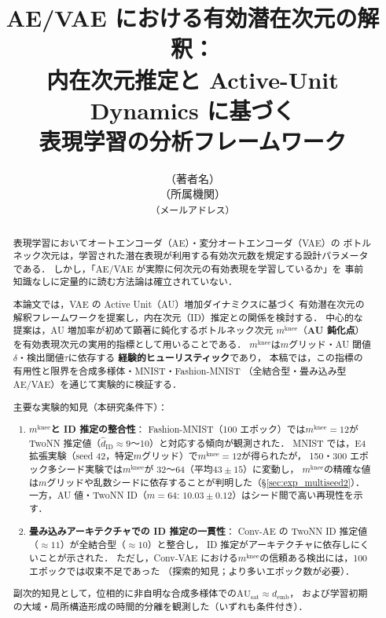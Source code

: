 \documentclass[11pt,a4paper]{jsarticle}
\title{AE/VAE における有効潜在次元の解釈：\\
       内在次元推定と Active-Unit Dynamics に基づく\\
       表現学習の分析フレームワーク}
\author{（著者名）\\
{\small （所属機関）}\\
{\small \texttt{（メールアドレス）}}}
\date{}
\newcommand{\mknee}{m^{\mathrm{knee}}}
\begin{document}
\maketitle

\begin{abstract}
表現学習においてオートエンコーダ（AE）・変分オートエンコーダ（VAE）の
ボトルネック次元は，学習された潜在表現が利用する有効次元数を規定する設計パラメータである．
しかし，「AE/VAE が実際に何次元の有効表現を学習しているか」を
事前知識なしに定量的に読む方法論は確立されていない．

本論文では，VAE の Active Unit（AU）増加ダイナミクスに基づく
有効潜在次元の解釈フレームワークを提案し，内在次元（ID）推定との関係を検討する．
中心的な提案は，AU 増加率が初めて顕著に鈍化するボトルネック次元
$m^{\mathrm{knee}}$（\textbf{AU 鈍化点}）を有効表現次元の実用的指標として用いることである．
$m^{\mathrm{knee}}$は$m$グリッド・AU 閾値$\delta$・検出閾値$\tau$に依存する
\textbf{経験的ヒューリスティック}であり，
本稿では，この指標の有用性と限界を合成多様体・MNIST・Fashion-MNIST
（全結合型・畳み込み型 AE/VAE）を通じて実験的に検証する．

主要な実験的知見（本研究条件下）：
\begin{enumerate}
  \item \textbf{$m^{\mathrm{knee}}$と ID 推定の整合性}：
        Fashion-MNIST（100 エポック）では$m^{\mathrm{knee}} = 12$が
        TwoNN 推定値（$\hat{d}_\mathrm{ID} \approx 9$〜10）と対応する傾向が観測された．
        MNIST では，E4 拡張実験（seed 42，特定$m$グリッド）で$\mknee = 12$が得られたが，
        150・300 エポック多シード実験では$\mknee$が 32〜64（平均$43 \pm 15$）に変動し，
        $\mknee$の精確な値は$m$グリッドや乱数シードに依存することが判明した（§\ref{sec:exp_multiseed2}）．
        一方，AU 値・TwoNN ID（$m=64$: $10.03 \pm 0.12$）はシード間で高い再現性を示す．
  \item \textbf{畳み込みアーキテクチャでの ID 推定の一貫性}：
        Conv-AE の TwoNN ID 推定値（$\approx 11$）が全結合型（$\approx 10$）と整合し，
        ID 推定がアーキテクチャに依存しにくいことが示された．
        ただし，Conv-VAE における$\mknee$の信頼ある検出には，100 エポックでは収束不足であった
        （探索的知見；より多いエポック数が必要）．
\end{enumerate}
副次的知見として，位相的に非自明な合成多様体での$\mathrm{AU}_{\mathrm{sat}} \approx d_{\mathrm{emb}}$，
および学習初期の大域・局所構造形成の時間的分離を観測した（いずれも条件付き）．
\end{abstract}
\end{document}
